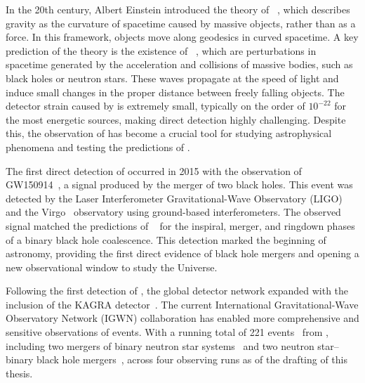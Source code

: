 In the 20th century, Albert Einstein introduced the theory of \GR~\cite{Einstein_1:1914, Einstein_2:1914, Einstein_3:1915, Einstein_4:1916, Einstein_5:1917, Einstein_6:1936}, which describes gravity as the curvature of spacetime caused by massive objects, rather than as a force. In this framework, objects move along geodesics in curved spacetime. A key prediction of the theory is the existence of \gws~\cite{Einstein_7:1937, Einstein_8:1938, Einstein_9:1939, Einstein_10:1948}, which are perturbations in spacetime generated by the acceleration and collisions of massive bodies, such as black holes or neutron stars. These waves propagate at the speed of light and induce small changes in the proper distance between freely falling objects. The detector strain caused by \gws is extremely small, typically on the order of $10^{-22}$ for the most energetic sources, making direct detection highly challenging. Despite this, the observation of \gws has become a crucial tool for studying astrophysical phenomena and testing the predictions of \GR.

The first direct detection of \gws occurred in 2015 with the observation of GW150914~\cite{GW150914:2016}, a \gwadj signal produced by the merger of two black holes. This event was detected by the Laser Interferometer Gravitational-Wave Observatory (LIGO) and the Virgo~\cite{aVirgo:2015} \gwadj observatory using ground-based interferometers. The observed signal matched the predictions of \GR~\cite{GW150914_TGR:2016} for the inspiral, merger, and ringdown phases of a binary black hole coalescence. This detection marked the beginning of \gwadj astronomy, providing the first direct evidence of black hole mergers and opening a new observational window to study the Universe.

Following the first detection of \gws, the global \gwadj detector network expanded with the inclusion of the KAGRA detector~\cite{KAGRA:2021}. The current International Gravitational-Wave Observatory Network (IGWN) collaboration has enabled more comprehensive and sensitive observations of \gwadj events. With a running total of 221 \gwadj events~\cite{gwtc1:2019, gwtc2:2021, gwtc21:2024, gwtc3:2023, 1OGC:2018, 2OGC:2020, 3OGC:2021, 4OGC:2021, Princeton_1:2019, Princeton_2:2019, Princeton_3a:2022, Princeton_3b:2023, gracedb_superevents:2024} from \cbcs, including two mergers of binary neutron star systems~\cite{GW170817:2017, GW190425:2020} and two neutron star–binary black hole mergers~\cite{nsbh:2021}, across four observing runs as of the drafting of this thesis.

